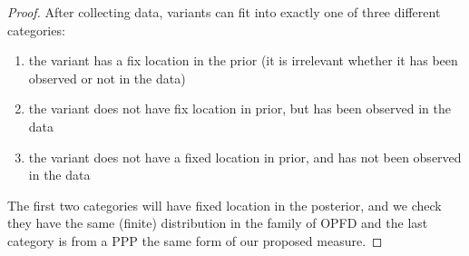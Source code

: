 \begin{proof}
After collecting data,  variants can fit into exactly one of three different categories:
\begin{enumerate} 
	\item[(i)] the variant has a fix location in the prior (it is irrelevant whether it has been observed or not in the data) 
	\item[(ii)] the variant does not have fix location in prior, but has been observed in the data 
	\item[(iii)] the variant does not have a fixed location in prior, and has not been observed in the data
\end{enumerate}
The first two categories will have fixed location in the posterior, and we check they have the same (finite) distribution in the family of OPFD and the last category is from a PPP the same form of our proposed measure. 
    

\end{proof}
